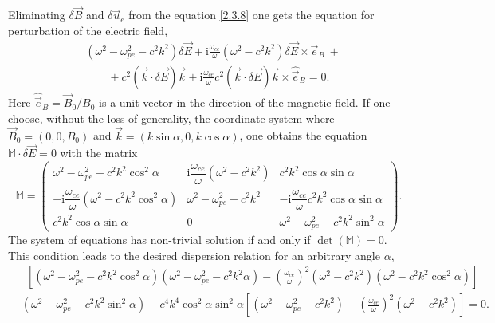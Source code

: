 Eliminating $ \delta \vec{B} $ and $ \delta \vec{u}_{e} $ from the equation \ref{2.3.8} one gets the equation for perturbation of the electric field,
\begin{equation}
\begin{split}
\label{2.3.9}
& \left( \omega^{2} - \omega_{pe}^{2} - c^{2} k^{2} \right) \delta \vec{E} + \mathrm{i} \frac{\omega_{ce}}{\omega} \left( \omega^{2} - c^{2} k^{2} \right) \delta \vec{E} \times \vec{e}_{B} \: + \\[5pt]
& \qquad + c^{2} \left( \vec{k} \cdot \delta \vec{E} \right) \vec{k} + \mathrm{i} \frac{\omega_{ce}}{\omega} c^{2} \left( \vec{k} \cdot \delta \vec{E} \right) \vec{k} \times \hat{\vec{e}}_{B} = 0.
\end{split}
\end{equation}
Here $ \hat{\vec{e}}_{B} = \vec{B}_{0}/B_{0} $ is a unit vector in the direction of the magnetic field. If one choose, without the loss of generality, the coordinate system where $ \vec{B}_{0} = (0, 0, B_{0}) $ and $ \vec{k} = (k \sin \alpha, 0, k \cos \alpha) $, one obtains the equation $ \mathbb{M} \cdot \delta \vec{E} = 0 $ with the matrix
\begingroup
\renewcommand*{\arraystretch}{2.0}
\begin{equation}
\label{2.3.11}
\mathbb{M} =  \begin{pmatrix}
 \omega^{2} - \omega_{pe}^{2} - c^{2} k^{2} \cos^{2} \alpha & \mathrm{i} \dfrac{\omega_{ce}}{\omega} \left( \omega^{2} - c^{2} k^{2} \right)  & c^{2} k^{2} \cos \alpha \sin \alpha \\
 - \mathrm{i} \dfrac{\omega_{ce}}{\omega} \left( \omega^{2} - c^{2} k^{2} \cos^{2} \alpha \right) & \omega^{2} - \omega_{pe}^{2} - c^{2} k^{2} & - \mathrm{i} \dfrac{\omega_{ce}}{\omega} c^{2} k^{2} \cos \alpha \sin \alpha \\
 c^{2} k^{2} \cos \alpha \sin \alpha & 0 & \omega^{2} - \omega_{pe}^{2} - c^{2} k^{2} \sin^{2} \alpha
 \end{pmatrix}.
\end{equation} 
\endgroup
The system of equations has non-trivial solution if and only if $ \det \left( \mathbb{M} \right) = 0 $. This condition leads to the desired dispersion relation for an arbitrary angle $ \alpha $,
\begin{equation}
\begin{split}
\label{2.3.12}
& \ \ \left[ \left( \omega^{2} - \omega_{pe}^{2} - c^{2} k^{2} \cos^{2} \alpha \right) \left( \omega^{2} - \omega_{pe}^{2} - c^{2} k^{2} \alpha \right) - \left(  \frac{\omega_{ce}}{\omega} \right)^{2} \left( \omega^{2} - c^{2} k^{2} \right) \left( \omega^{2} - c^{2} k^{2} \cos^{2} \alpha \right) \right]\\[5pt]
& \left( \omega^{2} - \omega_{pe}^{2} - c^{2} k^{2} \sin^{2} \alpha \right) - c^{4} k^{4} \cos^{2} \alpha \sin^{2} \alpha \left[ \left( \omega^{2} - \omega_{pe}^{2} - c^{2} k^{2} \right) - \left( \frac{\omega_{ce}}{\omega} \right)^{2} \left( \omega^{2} - c^{2} k^{2} \right) \right] = 0.\\[5pt]
\end{split}
\end{equation}
